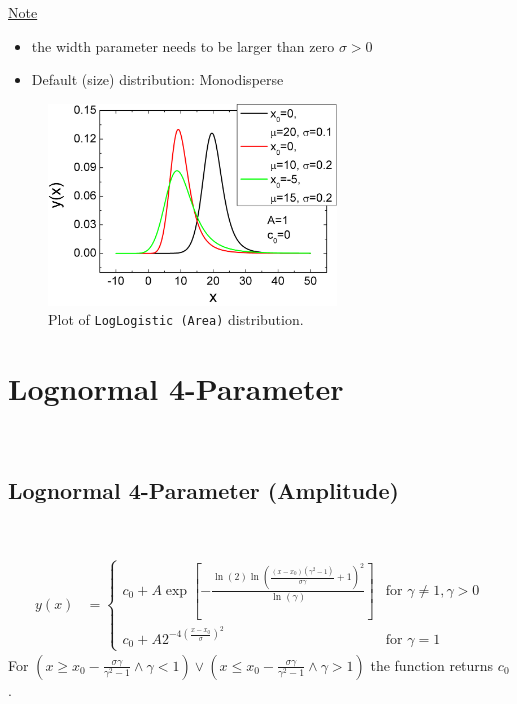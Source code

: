 \underline{Note}
\begin{itemize}
  \item the width parameter needs to be larger than zero $\sigma > 0$
  \item Default (size) distribution: Monodisperse
\end{itemize}


\begin{figure}[htb]
\begin{center}
\includegraphics[width=0.6824\textwidth]{LogLogisticArea.png}
\end{center}
\caption{Plot of \texttt{LogLogistic (Area)} distribution.}
\label{fig:LogLogisticArea}
\end{figure}
\clearpage

\section{Lognormal 4-Parameter} ~\\
\label{sec:LogNormal4Parameter}
\subsection{Lognormal 4-Parameter (Amplitude)} ~\\
\label{sec:LogNormal4ParameterAmplitude}

\begin{align}
y(x) & =
\begin{cases}
c_0+A \exp\left[ - \frac{\ln(2)\ln\left(\frac{(x-x_0)(\gamma^2-1)}{\sigma\gamma}+1\right)^2}{\ln(\gamma)}\right] & \mbox{for } \gamma \neq 1, \gamma > 0 \\
c_0+A 2^{-4\left(\frac{x-x_0}{\sigma}\right)^2} & \mbox{for } \gamma = 1
\end{cases}
\end{align}
For $\left(x \geq x_0-\frac{\sigma\gamma}{\gamma^2-1} \wedge \gamma < 1\right)
\vee \left(x \leq x_0-\frac{\sigma\gamma}{\gamma^2-1} \wedge \gamma > 1\right)$ the function returns $c_0$.
\vspace{2mm}

